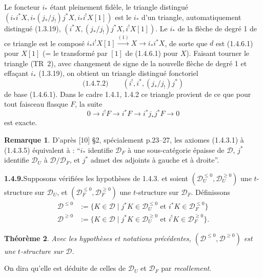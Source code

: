 \documentclass[12pt,a4paper]{article}
\theoremstyle{plain}
\newtheorem{theorem}{Th\'eor\`eme}[section]
\theoremstyle{definition}
\newtheorem{remark}[theorem]{Remarque}
\begin{document}
Le foncteur $i_*$ \'etant pleinement fid\`ele, le triangle distingu\'e $(i_*i^*X, i_*(j_*/j_!)j^*X, i_*i^!X[1])$ est le $i_*$ d'un triangle, automatiquement distingu\'e (1.3.19), $(i^*X, (j_*/j_!)j^*X, i^!X[1])$. Le $i_*$ de la fl\`eche de degr\'e 1 de ce triangle est le compos\'e $i_*i^!X[1] \xrightarrow{(1)} X \to i_*i^*X$, de sorte que $d$ est (1.4.6.1) pour $X[1]$ (= le transform\'e par $[1]$ de (1.4.6.1) pour $X$). Faisant tourner le triangle (TR~2), avec changement de signe de la nouvelle fl\`eche de degr\'e 1 et effa\c{c}ant $i_*$ (1.3.19), on obtient un triangle distingu\'e fonctoriel
\[
\text{(1.4.7.2)}\qquad (i^!, i^*, (j_*/j_!)j^*)
\]
de base (1.4.6.1). Dans le cadre 1.4.1, 1.4.2 ce triangle provient de ce que pour tout faisceau flasque $F$, la suite
\[
0 \to i^!F \to i^*F \to i^*j_*j^*F \to 0
\]
est exacte.

\begin{remark}\label{rem:1.4.8}
D'apr\`es [10] \S 2, sp\'ecialement p.23--27, les axiomes (1.4.3.1) \`a (1.4.3.5) \'equivalent \`a : ``$i_*$ identifie $\mathcal{D}_F$ \`a une sous-cat\'egorie \'epaisse de $\mathcal{D}$, $j^*$ identifie $\mathcal{D}_U$ \`a $\mathcal{D}/\mathcal{D}_F$, et $j^*$ admet des adjoints \`a gauche et \`a droite''.
\end{remark}

\smallskip
\noindent\textbf{1.4.9.}\quad Supposons v\'erifi\'ees les hypoth\`eses de 1.4.3. et soient $(\mathcal{D}_U^{\leqslant 0}, \mathcal{D}_U^{\geqslant 0})$ une $t$-structure sur $\mathcal{D}_U$, et $(\mathcal{D}_F^{\leqslant 0}, \mathcal{D}_F^{\geqslant 0})$ une $t$-structure sur $\mathcal{D}_F$. D\'efinissons
\begin{align*}
\mathcal{D}^{\leqslant 0} &:= \{K \in \mathcal{D} \mid j^*K \in \mathcal{D}_U^{\leqslant 0} \text{ et } i^*K \in \mathcal{D}_F^{\leqslant 0}\}\\
\mathcal{D}^{\geqslant 0} &:= \{K \in \mathcal{D} \mid j^*K \in \mathcal{D}_U^{\geqslant 0} \text{ et } i^!K \in \mathcal{D}_F^{\geqslant 0}\}.
\end{align*}

\begin{theorem}\label{thm:1.4.10}
Avec les hypoth\`eses et notations pr\'ec\'edentes, $(\mathcal{D}^{\leqslant 0}, \mathcal{D}^{\geqslant 0})$ est une $t$-structure sur $\mathcal{D}$.
\end{theorem}

On dira qu'elle est d\'eduite de celles de $\mathcal{D}_U$ et $\mathcal{D}_F$ par \emph{recollement}.
\end{document}
